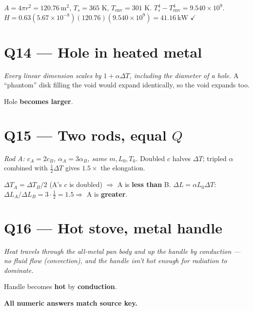\documentclass[11pt]{article}
\newcommand{\checkmk}{\ensuremath{\checkmark}}
\begin{document}
$A = 4\pi r^2 = 120.76\ \text{m}^2$, $T_s = 365$ K, $T_{\text{env}} = 301$ K.
$T_s^4 - T_{\text{env}}^4 = 9.540\times10^9$.
$H = 0.63(5.67\times10^{-8})(120.76)(9.540\times10^9) = \boxed{41.16\ \text{kW}}$ \checkmk

\section*{Q14 --- Hole in heated metal}
\emph{Every linear dimension scales by $1+\alpha\Delta T$, including the diameter of a hole.} A ``phantom'' disk filling the void would expand identically, so the void expands too.

Hole \textbf{becomes larger}.

\section*{Q15 --- Two rods, equal $Q$}
\emph{Rod A: $c_A=2c_B$, $\alpha_A=3\alpha_B$, same $m,L_0,T_0$.} Doubled $c$ halves $\Delta T$; tripled $\alpha$ combined with $\tfrac12\Delta T$ gives $1.5\times$ the elongation.

$\Delta T_A = \Delta T_B/2$ (A's $c$ is doubled) $\Rightarrow$ A is \textbf{less than} B.
$\Delta L = \alpha L_0\Delta T$: $\Delta L_A/\Delta L_B = 3\cdot\tfrac12 = 1.5 \Rightarrow$ A is \textbf{greater}.

\section*{Q16 --- Hot stove, metal handle}
\emph{Heat travels through the all-metal pan body and up the handle by conduction --- no fluid flow (convection), and the handle isn't hot enough for radiation to dominate.}

Handle becomes \textbf{hot} by \textbf{conduction}.

\bigskip\noindent\textbf{All numeric answers match source key.}
\end{document}
